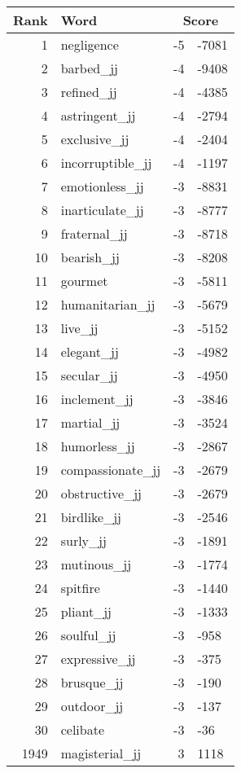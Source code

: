 \begin{longtable}[!htbp]{| rlr@{.}l |}
    \hline
    \textbf{Rank} & \textbf{Word} & \multicolumn{2}{c|}{\textbf{Score}} \\
    \hline
    \endhead
    1 & negligence & -5 & -7081 \\
    2 & barbed\_jj & -4 & -9408 \\
    3 & refined\_jj & -4 & -4385 \\
    4 & astringent\_jj & -4 & -2794 \\
    5 & exclusive\_jj & -4 & -2404 \\
    6 & incorruptible\_jj & -4 & -1197 \\
    7 & emotionless\_jj & -3 & -8831 \\
    8 & inarticulate\_jj & -3 & -8777 \\
    9 & fraternal\_jj & -3 & -8718 \\
    10 & bearish\_jj & -3 & -8208 \\
    11 & gourmet & -3 & -5811 \\
    12 & humanitarian\_jj & -3 & -5679 \\
    13 & live\_jj & -3 & -5152 \\
    14 & elegant\_jj & -3 & -4982 \\
    15 & secular\_jj & -3 & -4950 \\
    16 & inclement\_jj & -3 & -3846 \\
    17 & martial\_jj & -3 & -3524 \\
    18 & humorless\_jj & -3 & -2867 \\
    19 & compassionate\_jj & -3 & -2679 \\
    20 & obstructive\_jj & -3 & -2679 \\
    21 & birdlike\_jj & -3 & -2546 \\
    22 & surly\_jj & -3 & -1891 \\
    23 & mutinous\_jj & -3 & -1774 \\
    24 & spitfire & -3 & -1440 \\
    25 & pliant\_jj & -3 & -1333 \\
    26 & soulful\_jj & -3 & -958 \\
    27 & expressive\_jj & -3 & -375 \\
    28 & brusque\_jj & -3 & -190 \\
    29 & outdoor\_jj & -3 & -137 \\
    30 & celibate & -3 & -36 \\
    1949 & magisterial\_jj & 3 & 1118 \\

\end{longtable}
